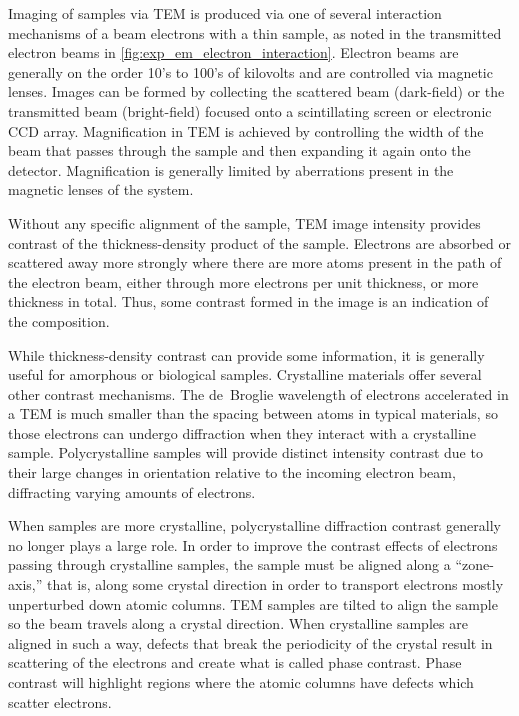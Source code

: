 Imaging of samples via TEM is produced via one of several interaction mechanisms of a beam electrons with a thin sample, as noted in the transmitted electron beams in \cref{fig:exp_em_electron_interaction}.
Electron beams are generally on the order 10's to 100's of kilovolts and are controlled via magnetic lenses\cite{Egerton2005}.
Images can be formed by collecting the scattered beam (dark-field) or the transmitted beam (bright-field) focused onto a scintillating screen or electronic CCD array.
Magnification in TEM is achieved by controlling the width of the beam that passes through the sample and then expanding it again onto the detector.
Magnification is generally limited by aberrations present in the magnetic lenses of the system.

Without any specific alignment of the sample, TEM image intensity provides contrast of the thickness-density product of the sample\cite{Egerton2005}.
Electrons are absorbed or scattered away more strongly where there are more atoms present in the path of the electron beam, either through more electrons per unit thickness, or more thickness in total.
Thus, some contrast formed in the image is an indication of the composition.

While thickness-density contrast can provide some information, it is generally useful for amorphous or biological samples.
Crystalline materials offer several other contrast mechanisms.
The de~Broglie wavelength of electrons accelerated in a TEM is much smaller than the spacing between atoms in typical materials, so those electrons can undergo diffraction when they interact with a crystalline sample.
Polycrystalline samples will provide distinct intensity contrast due to their large changes in orientation relative to the incoming electron beam, diffracting varying amounts of electrons\cite{Egerton2005}.

When samples are more crystalline, polycrystalline diffraction contrast generally no longer plays a large role.
In order to improve the contrast effects of electrons passing through crystalline samples, the sample must be aligned along a ``zone-axis,'' that is, along some crystal direction in order to transport electrons mostly unperturbed down atomic columns.
TEM samples are tilted to align the sample so the beam travels along a crystal direction.
When crystalline samples are aligned in such a way, defects that break the periodicity of the crystal result in scattering of the electrons and create what is called phase contrast.
Phase contrast will highlight regions where the atomic columns have defects which scatter electrons\cite{Egerton2005}.

